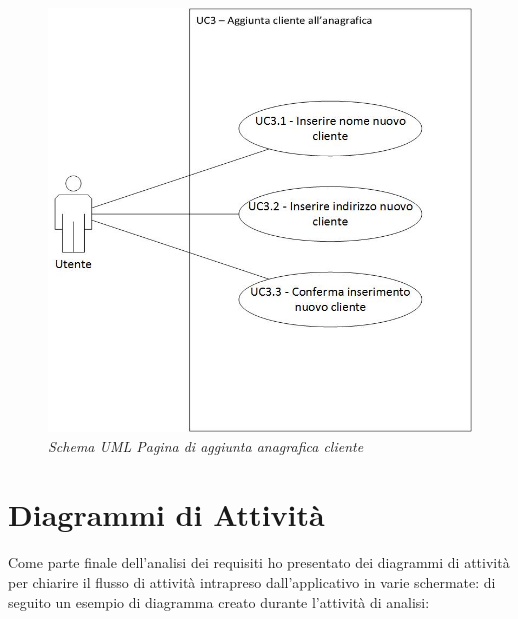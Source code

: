 \begin{figure}[ht]
	\centering
	\includegraphics[scale=0.35]{immagini/analisi/UC03_aggiunta_cliente_anagrafica.jpg}
	\caption{\textit{Schema UML Pagina di aggiunta anagrafica cliente}}
\end{figure}\FloatBarrier


\section{Diagrammi di Attività}
Come parte finale dell'analisi dei requisiti ho presentato dei diagrammi di attività per chiarire il flusso di attività intrapreso dall'applicativo in varie schermate: di seguito un esempio di diagramma creato durante l'attività di analisi:

